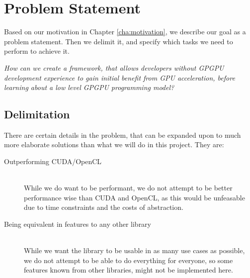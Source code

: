 \section{Problem Statement}
Based on our motivation in Chapter \ref{cha:motivation}, we describe our goal as a problem statement. Then we delimit it, and specify which tasks we need to perform to achieve it.

\textit{How can we create a framework, that allows developers without GPGPU development experience to gain initial benefit from GPU acceleration, before learning about a low level GPGPU programming model?}

\subsection{Delimitation}
There are certain details in the problem, that can be expanded upon to much more elaborate solutions than what we will do in this project. They are:
\begin{description}
\item[Outperforming CUDA/OpenCL] \hfill \\
While we do want to be performant, we do not attempt to be better performance wise than CUDA and OpenCL, as this would be unfeasable due to time constraints and the costs of abstraction.
\item[Being equivalent in features to any other library] \hfill \\
While we want the library to be usable in as many use cases as possible, we do not attempt to be able to do everything for everyone, so some features known from other libraries, might not be implemented here.
\end{description}

